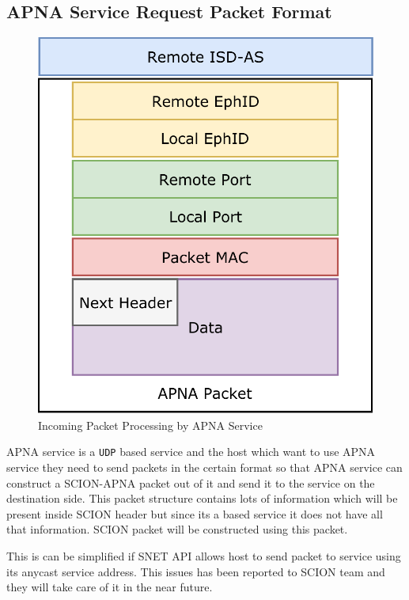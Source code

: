 \subsection{APNA Service Request Packet Format}
\begin{figure}[th!!]
\centering
\includegraphics[scale=0.6]{Figures/apna_svc_request_pkt.pdf}
\decoRule
\caption[APNA Service Incoming Packet]{Incoming Packet Processing by APNA Service}
\label{fig:apna_svc_request_pkt}
\end{figure}
APNA service is a \texttt{UDP} based service and the host which want to use APNA service they need to send packets in the certain format so that APNA service can construct a SCION-APNA packet out of it and send it to the service on the destination side. This packet structure contains lots of information which will be present inside SCION header but since its a based service it does not have all that information. SCION packet will be constructed using this packet.

This is can be simplified if SNET API allows host to send packet to service using its anycast service address. This issues has been reported to SCION team and they will take care of it in the near future. 

